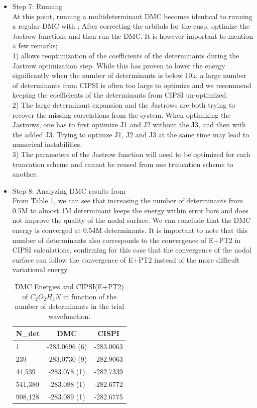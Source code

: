 \begin{itemize}
\item Step 7: Running \qmcpack \\
At this point, running a multideterminant DMC becomes identical to running a regular DMC with \qmcpack; 
After correcting the orbitals for the cusp, optimize the Jastrow functions and then run the DMC. 
It is however important to mention a few remarks;\\

1) \qmcpack allows reoptimization of the coefficients of the determinants during the Jastrow optimization step. While this has proven to lower the energy significantly when the number of determinants is below 10k, a large number of determinants from CIPSI is often too large to optimize and we recommend keeping the coefficients of the determinants from CIPSI un-optimized.\\

2) The large determinant expansion and the Jastrows are both trying to recover the missing correlations from the system. When optimizing the Jastrows, one has to first optimize J1 and J2 without the J3, and then with the added J3. Trying to optimze J1, J2 and J3 at the same time may lead to numerical instabilities.\\

3) The parameters of the Jastrow function will need to be optimized for each truncation scheme and cannot be reused from one truncation scheme to another.

\item Step 8: Analyzing DMC results from \qmcpack \\

From Table \ref{TAB:CIPSI-DMC}, we can see that increasing the number of determinants from 0.5M to almost 1M determinant keeps the energy within error bars and does not improve the quality of the nodal surface. We can conclude that the DMC energy is converged at 0.54M determinants. It is important to note that this number of determinants also corresponds to the convergence of E+PT2 in CIPSI calculations, confirming for this case that the convergence of the nodal surface can follow the convergence of E+PT2 instead of the more difficult variational energy.   


\begin{table}[t]
\centering
\caption{DMC Energies and CIPSI(E+PT2) of $C_2O_2H_3N$ in function of the number of determinants in the trial wavefunction.}
\label{TAB:CIPSI-DMC}
\begin{tabular}{l|c|c}
\hline 
N\_det & DMC& CISPI\\
\hline
1 & -283.0696 (6)&-283.0063\\
239 & -283.0730 (9)&-282.9063\\
44,539 & -283.078 (1)&-282.7339\\
541,380 & -283.088 (1)&-282.6772\\
908,128& -283.089  (1)&-282.6775\end{tabular}
\end{table}

\end{itemize}

